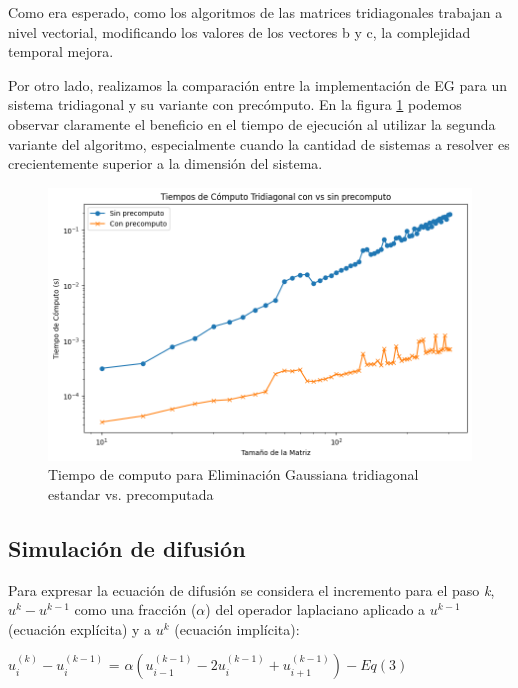     Como era esperado, como los algoritmos de las matrices tridiagonales trabajan a nivel vectorial, modificando los valores de los vectores b y c, la complejidad temporal mejora.

    Por otro lado, realizamos la comparación entre la implementación de EG para un sistema tridiagonal y su variante con precómputo. En la figura \ref{result_ej5_2do} podemos observar claramente el beneficio en el tiempo de ejecución al utilizar la segunda variante del algoritmo, especialmente cuando la cantidad de sistemas a resolver es crecientemente superior a la dimensión del sistema.

    \begin{figure}[H]
    \centerline{\includegraphics[scale=0.45]{./img/tiempos_tridiagConVsSinP.png}}
    \caption{Tiempo de computo para Eliminación Gaussiana tridiagonal estandar vs. precomputada}
    \label{result_ej5_2do}
    \end{figure}



    \subsection{Simulación de difusión}

    Para expresar la ecuación de difusión se considera el incremento para el paso \textit{k}, $u^k - u^{k-1}$ como una fracción ($\alpha$) del operador laplaciano aplicado a $u^{k-1}$ (ecuación explícita) y a $u^{k}$ (ecuación implícita):
    \begin{center}
      $u_i^{(k)} - u_i^{(k-1)}$ = $\alpha(u_{i-1}^{(k-1)} - 2u_i^{(k-1)} + u_{i+1}^{(k-1)}) - Eq (3)$
    \end{center}

